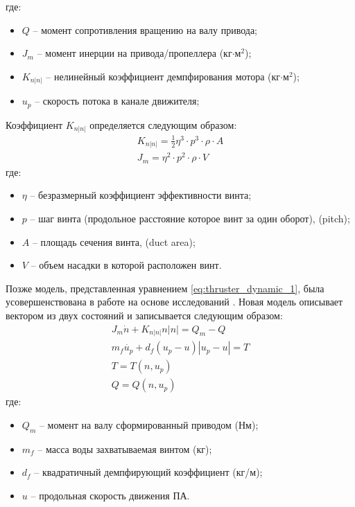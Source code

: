 \noindent где:
\begin{itemize}
    \item $Q$ -- момент сопротивления вращению на валу привода;
    \item $J_m$ -- момент инерции на привода/пропеллера (кг$\cdot$м$^2$);
    \item $K_{n|n|}$ -- нелинейный коэффициент демпфирования мотора (кг$\cdot$м$^2$);
    \item $u_p$ -- скорость потока в канале движителя;
\end{itemize}

Коэффициент $K_{n|n|}$ определяется следующим образом:
\begin{gather}
    K_{n|n|} = \frac{1}{2}\eta^3 \cdot p^3 \cdot \rho \cdot A \\
    J_m = \eta^2 \cdot p^2 \cdot \rho \cdot V
\end{gather}
где:
\begin{itemize}
    \item $\eta$ -- безразмерный коэффициент эффективности винта;
    \item $p$ -- шаг винта (продольное расстояние которое винт за один оборот), (pitch);
    \item $A$ -- площадь сечения винта, (duct area);
    \item $V$ -- объем насадки в которой расположен винт.
\end{itemize}

Позже модель, представленная уравнением \ref{eq:thruster_dynamic_1}, была усовершенствована в работе \cite{10.1109/48.468242} на основе исследований \cite{cody1992experimental, mclean1991dynamic}.
Новая модель описывает вектором из двух состояний и записывается следующим образом:
\begin{gather}
    J_m\dot{n} + K_{n|n|}n|n| = Q_m- Q \\
    m_f \dot{u_p} + d_f(u_p-u) |u_p - u| = T \\
    T = T(n,u_p) \\
    Q = Q(n,u_p)
\end{gather}
\noindent где:
\begin{itemize}
    \item $Q_m$ -- момент на валу сформированный приводом (Нм);
    \item $m_f$ -- масса воды захватываемая винтом (кг);
    \item $d_f$ -- квадратичный демпфирующий коэффициент (кг/м);
    \item $u$ -- продольная скорость движения ПА.
\end{itemize}

